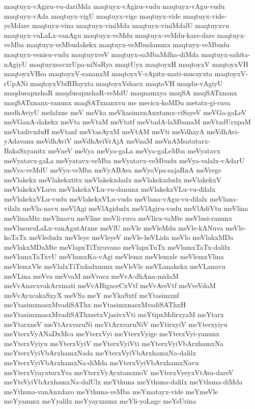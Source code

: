 {maqtuyx-vAgiru-vu-dariMda
maqtuyx-vAgiru-vudu
maqtuyx-vAgu-vudu
maqtuyx-vAda
maqtuyx-vigU
maqtuyx-vige
maqtuyx-vide
maqtuyx-vide-yeMdare
maqtuyx-vina
maqtuyx-viniMda
maqtuyx-viniMdalU
maqtuyxvu
maqtuyx-vuLaLx-vanAgu
maqtuyx-veMdu
maqtuyx-veMdu-kare-dare
maqtuyx-veMba
maqtuyx-veMbudakekx
maqtuyx-veMbudanunx
maqtuyx-veMbudu
maqtuyx-venisu-vudu
maqtuyxveV
maqtuyx-saMbaMdha-diMda
maqtuyx-sahita-nAgiyU
maqtuyxsavxrUpa-niNaRya
maqtUyx
maqtoyxH
maqtoyxV
maqtoyxVH
maqtoyxVHsa
maqtoyxV-rananxM
maqtoyxV-rApitx-mati-mucayxta
maqtoyxV-rUpANi
maqtoyxVbiRBayxta
maqtoyxVshacx
maqtoVH
maqdu-vAgiyU
maqdusapxshaR
maqdusapxshaR-veMdU
maqnamxya
maqSA
maqSATxnanx
maqSATxnanx-vanunx
maqSATxnanxvu
me
mecicx-koMDu
metatx-gi-ruva
medhAviyU
melalxne
meV
meVka
meVkasimxnAnxtamx-viSayeV
meVGa-gaLeV
meVGanA-dakekx
meVta
meVtaM
meVtatf
meVtadA-laMbanaM
meVtadUrxpaM
meVtadivxduH
meVtanf
meVtasAyxM
meVtAM
meVti
meVdhayA
meVdhAvi-yAdavanu
meVdhAviV
meVdhAviVrAjA
meVnaM
meVnAMsatxtarx-BakaSxyanitx
meVneV
meVya
meVya-gaLa
meVya-gaLeMba
meVyatavx
meVyatavx-gaLa
meVyatavx-veMba
meVyatavx-veMbudu
meVya-valalx-vAdarU
meVya-veMdU
meVya-veMba
meVyABAva
meVyoVpa-sajaRnA
meVrege
meVlakekx
meVlakekxtitx
meVlakekxdadx
meVlakekxdudx
meVlakekxV
meVlakekxVLuva
meVlakekxVLu-vu-danunx
meVlakekxVLu-vu-dilalx
meVlakekxVLu-vudu
meVlakekxVLu-vudo
meVlana-vAgu-vu-dilalx
meVlana-vilalx
meVla-navu
meVlAgi
meVlAgidudx
meVlAgiru-vudu
meVlAdiVtu
meVlina
meVlinaMte
meVlinavu
meVline
meVli-ruva
meVliru-vaMte
meVlusi-ranunx
meVlusuruLaLx-vanAgutAtxne
meVlU
meVle
meVleMdu
meVle-kANuva
meVle-koTaTx
meVledudx
meVleye
meVleyeV
meVle-heVLida
meVlo
meVlakxMDa
meVlakxMDaMte
meVlapxTiTxruvano
meVlapxTuTx
meVlamxTaTx-dalilx
meVlamxTaTxvU
meVlumxKa-vAgi
meVlemx
meVlemxle
meVlemxVlina
meVlemxVle
meVlalxTiTxdadxnunx
meVleVle
meVLanakekx
meVLanavu
meVLina
meVva
meVvaM
meVvaca
meVvA-dhAna-midaM
meVvAnavxvakArxmati
meVvABigaceCxVtf
meVvAveVtf
meVveVdaM
meVvAyxcakaSxyX
meVSa
meY
meYkaSxtf
meYtasimxnf
meYtasimxnasxMvadiSAThx
meYtasimxnasxMvadiSAThxH
meYtasimxnasxMvadiSAThxsetxVjasivxVti
meYtipxMdirxyaM
meYtarx
meYtarxneV
meYtArxvaruNi
meYtArxvaruNiV
meYtirxyiV
meYterxyiyu
meYterxVyANaDxMca
meYterxVyi
meYterxVyige
meYterxVyi-yanunx
meYterxVyiyu
meYterxVyiV
meYterxVyiVti
meYterxVyiVbArxhamxNa
meYterxVyiVbArxhamxNada
meYterxVyiVbArxhamxNa-dalilx
meYterxVyiVbArxhamxNa-diMda
meYterxVyiVbArxhamxNavu
meYterxVyayxterxYva
meYterxVyAyxtamxnoV
meYterxVyeyxVtAva-dareV
meYteVyiVbArxhamxNa-dalUlx
meYthuna
meYthuna-dalilx
meYthuna-diMda
meYthuna-vanAnxdaro
meYthuna-veMba
meYmatayx-vide
meYmeVle
meYyanunx
meYyalilx
meYyayxnunx
meYli-yoLage
meYsUrina
}
